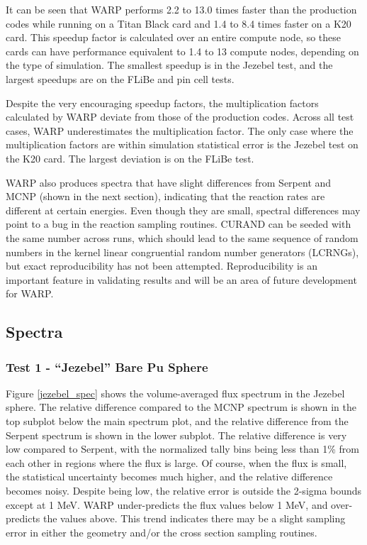 \documentclass[preprint,12pt]{elsarticle}
\begin{document}
It can be seen that WARP performs 2.2 to 13.0 times faster than the production codes while running on a Titan Black card and 1.4 to 8.4 times faster on a K20 card.  This speedup factor is calculated over an entire compute node, so these cards can have performance equivalent to 1.4 to 13 compute nodes, depending on the type of simulation.   The smallest speedup is in the Jezebel test, and the largest speedups are on the FLiBe and pin cell tests.

Despite the very encouraging speedup factors, the multiplication factors calculated by WARP deviate from those of the production codes.  Across all test cases, WARP underestimates the multiplication factor.  The only case where the multiplication factors are within simulation statistical error is the Jezebel test on the K20 card.  The largest deviation is on the FLiBe test.  

WARP also produces spectra that have slight differences from Serpent and MCNP (shown in the next section), indicating that the reaction rates are different at certain energies.  Even though they are small, spectral differences may point to a bug in the reaction sampling routines.  CURAND can be seeded with the same number across runs, which should lead to the same sequence of random numbers in the kernel linear congruential random number generators (LCRNGs), but exact reproducibility has not been attempted.  Reproducibility is an important feature in validating results and will be an area of future development for WARP.

\newpage
\subsection{Spectra}

\subsubsection{Test 1 - ``Jezebel'' Bare Pu Sphere}

Figure \ref{jezebel_spec} shows the volume-averaged flux spectrum in the Jezebel sphere.  The relative difference compared to the MCNP spectrum is shown in the top subplot below the main spectrum plot, and the relative difference from the Serpent spectrum is shown in the lower subplot.  The relative difference is very low compared to Serpent, with the normalized tally bins being less than 1\% from each other in regions where the flux is large.  Of course, when the flux is small, the statistical uncertainty becomes much higher, and the relative difference becomes noisy.   Despite being low, the relative error is outside the 2-sigma bounds except at 1 MeV.  WARP under-predicts the flux values below 1 MeV, and over-predicts the values above.  This trend indicates there may be a slight sampling error in either the geometry and/or the cross section sampling routines. 
\end{document}
